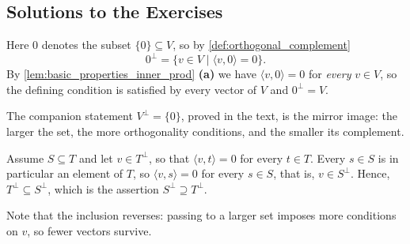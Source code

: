 \subsection{Solutions to the Exercises}
\label{sec:solutions_orthogonal_complement}

\begin{exercisesolution}[Proof of \cref{lem:orthogonal_complement_properties} \textbf{(b)}, the identity $0^\perp = V$]
\label{sol:orthogonal_complement_properties_b}
  Here $0$ denotes the subset $\{0\} \subseteq V$, so by \cref{def:orthogonal_complement}
  \[ 0^\perp = \{ v \in V \mid \langle v, 0 \rangle = 0 \}. \]
  By \cref{lem:basic_properties_inner_prod} \textbf{(a)} we have $\langle v, 0 \rangle = 0$ for \emph{every} $v \in V$, so the defining condition is satisfied by every vector of $V$ and $0^\perp = V$.

  The companion statement $V^\perp = \{0\}$, proved in the text, is the mirror image: the larger the set, the more orthogonality conditions, and the smaller its complement.
\end{exercisesolution}

\begin{exercisesolution}
\label{sol:orthogonal_complement_properties_d}
  Assume $S \subseteq T$ and let $v \in T^\perp$, so that $\langle v, t \rangle = 0$ for every $t \in T$. Every $s \in S$ is in particular an element of $T$, so $\langle v, s \rangle = 0$ for every $s \in S$, that is, $v \in S^\perp$. Hence, $T^\perp \subseteq S^\perp$, which is the assertion $S^\perp \supseteq T^\perp$.

  Note that the inclusion reverses: passing to a larger set imposes more conditions on $v$, so fewer vectors survive.
\end{exercisesolution}

